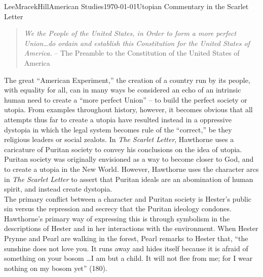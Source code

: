 \documentclass[12pt, letterpaper]{article}
\begin{document}
\begin{mla}{Lee}{Mracek}{Hill}{American Studies}{\today}{Utopian Commentary in the Scarlet Letter}
\begin{quotation}
\textit{We the People of the United States, in Order to form a more perfect Union\ldots do ordain and establish this Constitution for the United States of America.} -- The Preamble to the Constitution of the United States of America
\end{quotation}
The great ``American Experiment,'' the creation of a country run by its people, with equality for all, can in many ways be considered an echo of an intrinsic human need to create a ``more perfect Union'' -- to build the perfect society or utopia. From examples throughout history, however, it becomes obvious that all attempts thus far to create a utopia have resulted instead in a oppressive dystopia in which the legal system becomes rule of the ``correct,'' be they religious leaders or social zealots. In \textit{The Scarlet Letter}, Hawthorne uses a caricature of Puritan society to convey his conclusions on the idea of utopia. Puritan society was originally envisioned as a way to become closer to God, and to create a utopia in the New World. However, Hawthorne uses the character arcs in \textit{The Scarlet Letter} to assert that Puritan ideals are an abomination of human spirit, and instead create dystopia. \\
        The primary conflict between a character and Puritan society is Hester's public sin versus the repression and secrecy that the Puritan ideology condones. Hawthorne's primary way of expressing this is through symbolism in the descriptions of Hester and in her interactions with the environment. When Hester Prynne and Pearl are walking in the forest, Pearl remarks to Hester that, ``the sunshine does not love you. It runs away and hides itself because it is afraid of something on your bosom \ldots I am but a child. It will not flee from me; for I wear nothing on my bosom yet'' (180).

\end{mla}
\end{document}
